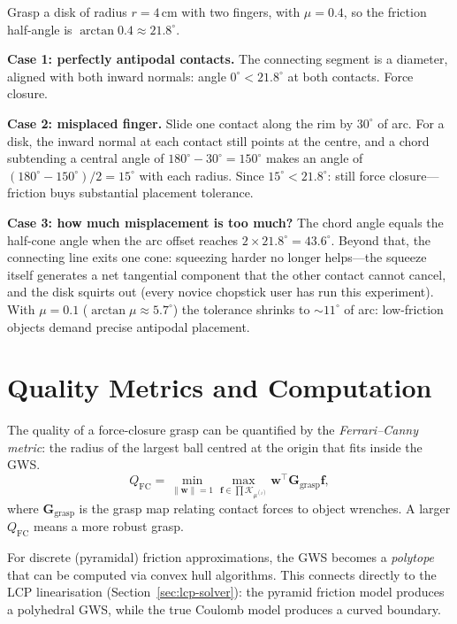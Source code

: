 \documentclass[11pt,twoside]{report}
\theoremstyle{definition}
\theoremstyle{plain}
\theoremstyle{remark}
\newcommand{\0}{\bm{0}}
\newcommand{\Kc}{\mathcal{K}}
\begin{document}
\begin{examplebox}
Grasp a disk of radius $r=4$\,cm with two fingers, with $\mu=0.4$, so
the friction half-angle is $\arctan 0.4\approx 21.8^{\circ}$.

\textbf{Case 1: perfectly antipodal contacts.} The connecting segment is
a diameter, aligned with both inward normals: angle $0^{\circ}<21.8^{\circ}$
at both contacts. Force closure. \checkmark

\textbf{Case 2: misplaced finger.} Slide one contact along the rim by
$30^{\circ}$ of arc. For a disk, the inward normal at each contact still
points at the centre, and a chord subtending a central angle of
$180^{\circ}-30^{\circ}=150^{\circ}$ makes an angle of
$(180^{\circ}-150^{\circ})/2=15^{\circ}$ with each radius.
Since $15^{\circ}<21.8^{\circ}$: still force closure---friction buys
substantial placement tolerance. \checkmark

\textbf{Case 3: how much misplacement is too much?} The chord angle
equals the half-cone angle when the arc offset reaches
$2\times 21.8^{\circ}=43.6^{\circ}$. Beyond that, the connecting line
exits one cone: squeezing harder no longer helps---the squeeze itself
generates a net tangential component that the other contact cannot
cancel, and the disk squirts out (every novice chopstick user has run
this experiment). With $\mu=0.1$ ($\arctan\mu\approx 5.7^{\circ}$) the
tolerance shrinks to ${\sim}11^{\circ}$ of arc: low-friction objects
demand precise antipodal placement.
\end{examplebox}

\section{Quality Metrics and Computation}

The quality of a force-closure grasp can be quantified by the \emph{Ferrari--Canny metric}: the radius of the largest ball centred at the origin that fits inside the GWS.
\begin{equation}
Q_{\text{FC}}=\min_{\|\bm{w}\|=1}\max_{\bm{f}\in\prod\Kc_{\mu^{(i)}}}\bm{w}^{\!\top}\bm{G}_{\text{grasp}}\bm{f},
\end{equation}
where $\bm{G}_{\text{grasp}}$ is the grasp map relating contact forces to object wrenches. A larger $Q_{\text{FC}}$ means a more robust grasp.

For discrete (pyramidal) friction approximations, the GWS becomes a \emph{polytope} that can be computed via convex hull algorithms. This connects directly to the LCP linearisation (Section~\ref{sec:lcp-solver}): the pyramid friction model produces a polyhedral GWS, while the true Coulomb model produces a curved boundary.
\end{document}
